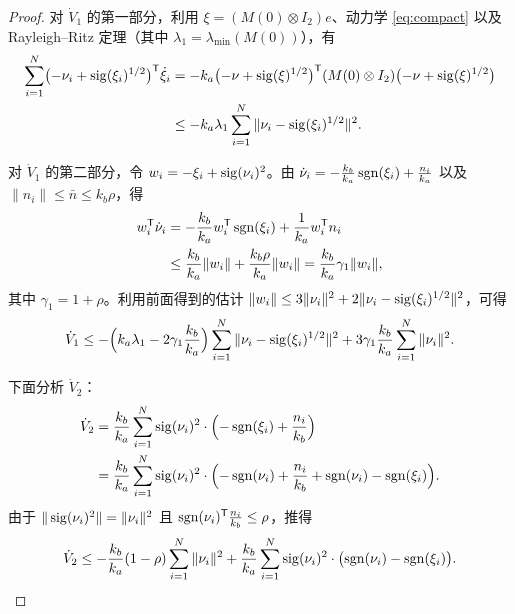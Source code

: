 \begin{proof}
    对 $\dot{V}_1$ 的第一部分，利用 $\xi = (M(0)\otimes I_2)e$、动力学 \eqref{eq:compact} 以及 Rayleigh–Ritz 定理（其中 $\lambda_1 = \lambda_{\min}(M(0))$），有
    \begin{align*}
        \sum_{i=1}^{N}\bigl(-\nu_i + \operatorname{sig}(\xi_i)^{1/2}\bigr)^\mathsf{T}\dot{\xi}_i
        &= -k_a\bigl(-\nu + \operatorname{sig}(\xi)^{1/2}\bigr)^\mathsf{T}(M(0)\otimes I_2)\bigl(-\nu + \operatorname{sig}(\xi)^{1/2}\bigr)\\
        &\le -k_a\lambda_1\sum_{i=1}^{N}\|\nu_i - \operatorname{sig}(\xi_i)^{1/2}\|^2.
    \end{align*}

    对 $\dot{V}_1$ 的第二部分，令 $w_i = -\xi_i + \operatorname{sig}(\nu_i)^2$。由 $\dot{\nu}_i = -\frac{k_b}{k_a}\operatorname{sgn}(\xi_i) + \frac{n_i}{k_a}$ 以及 $\|n_i\|\le \bar{n}\le k_b\rho$，得
    \begin{align*}
        w_i^\mathsf{T}\dot{\nu}_i 
        &= -\frac{k_b}{k_a}w_i^\mathsf{T}\operatorname{sgn}(\xi_i) + \frac{1}{k_a}w_i^\mathsf{T}n_i\\
        &\le \frac{k_b}{k_a}\|w_i\| + \frac{k_b\rho}{k_a}\|w_i\|
         = \frac{k_b}{k_a}\gamma_1\|w_i\|,
    \end{align*}
    其中 $\gamma_1 = 1+\rho$。利用前面得到的估计 $\|w_i\|\le 3\|\nu_i\|^2 + 2\|\nu_i - \operatorname{sig}(\xi_i)^{1/2}\|^2$，可得
    \begin{equation}
        \dot{V}_1 \le -\Bigl(k_a\lambda_1 - 2\gamma_1\frac{k_b}{k_a}\Bigr)\sum_{i=1}^{N}\|\nu_i - \operatorname{sig}(\xi_i)^{1/2}\|^2 
                  + 3\gamma_1\frac{k_b}{k_a}\sum_{i=1}^{N}\|\nu_i\|^2. \label{eq:dotV1}
    \end{equation}

    下面分析 $\dot{V}_2$：
    \begin{align*}
        \dot{V}_2 &= \frac{k_b}{k_a}\sum_{i=1}^{N}\operatorname{sig}(\nu_i)^2\cdot\Bigl(-\operatorname{sgn}(\xi_i) + \frac{n_i}{k_b}\Bigr)\\
        &= \frac{k_b}{k_a}\sum_{i=1}^{N}\operatorname{sig}(\nu_i)^2\cdot\Bigl(-\operatorname{sgn}(\nu_i) + \frac{n_i}{k_b} + \operatorname{sgn}(\nu_i) - \operatorname{sgn}(\xi_i)\Bigr).
    \end{align*}
    由于 $\|\operatorname{sig}(\nu_i)^2\| = \|\nu_i\|^2$ 且 $\operatorname{sgn}(\nu_i)^\mathsf{T}\frac{n_i}{k_b} \le \rho$，推得
    \begin{equation}
        \dot{V}_2 \le -\frac{k_b}{k_a}(1-\rho)\sum_{i=1}^{N}\|\nu_i\|^2 
                   + \frac{k_b}{k_a}\sum_{i=1}^{N}\operatorname{sig}(\nu_i)^2\cdot\bigl(\operatorname{sgn}(\nu_i) - \operatorname{sgn}(\xi_i)\bigr). \label{eq:dotV2_1}
    \end{equation}


\end{proof}
